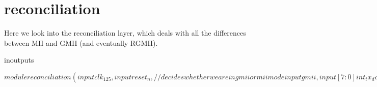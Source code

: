 \chapter{reconciliation}

Here we look into the reconciliation layer, which deals with all the differences between MII and GMII (and eventually RGMII).

\begin{chunk}{inoutputs}

$
module reconciliation
(input clk_125, input reset_n,
 
 // decides whether we are in gmii or mii mode
 input gmii,

 input [7:0] int_tx_dout,
 input int_tx_en,
 input int_tx_er,
 output int_tx_clk,

 output [7:0] int_rx_din,
 output int_rx_dv,
 output int_rx_er,
 output int_rx_clk,
 
 output [7:0] phy_TXD,
 output       phy_TXEN,
 output       phy_TXER,
 output       phy_GTXCLK,
 input        phy_TXCLK,
 input  [7:0] phy_RXD,
 input        phy_RXDV,
 input        phy_RXER,
 input        phy_RXCLK
 );	
$

\end{chunk}


